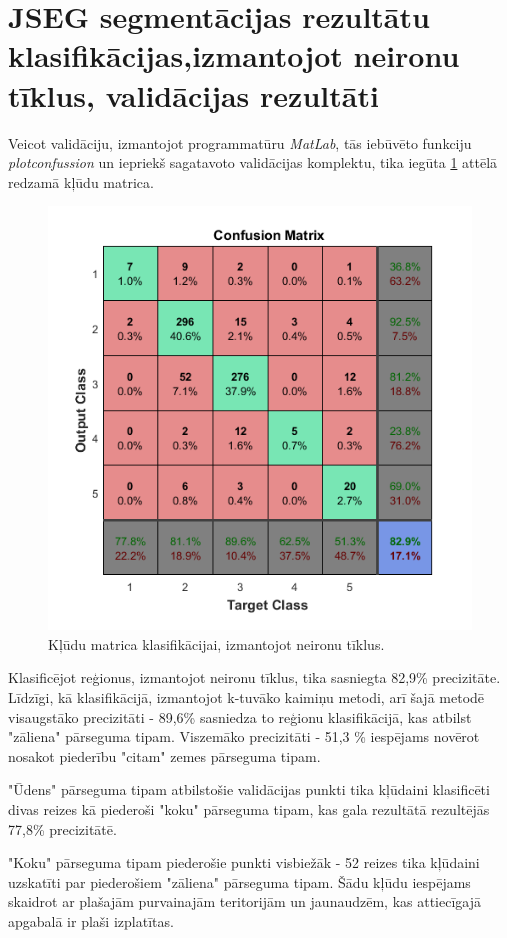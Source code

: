 \documentclass[12pt,paper=a4]{report}
\begin{document}
\section{JSEG segmentācijas rezultātu klasifikācijas,izmantojot neironu tīklus, validācijas rezultāti}
Veicot validāciju, izmantojot programmatūru \textit{MatLab}, tās iebūvēto funkciju \textit{plotconfussion} un iepriekš sagatavoto validācijas komplektu, tika iegūta \ref{fig:NNconfMatrix} attēlā redzamā kļūdu matrica. 
\begin{figure}[h!]
\centering
\includegraphics[width=.7\linewidth]{NNconfMatrix}
\caption{Kļūdu matrica klasifikācijai, izmantojot neironu tīklus.}
\label{fig:NNconfMatrix}
\end{figure}\par
Klasificējot reģionus, izmantojot neironu tīklus, tika sasniegta 82,9\% precizitāte. Līdzīgi, kā klasifikācijā, izmantojot k-tuvāko kaimiņu metodi, arī šajā metodē visaugstāko precizitāti - 89,6\% sasniedza to reģionu klasifikācijā, kas atbilst "zāliena" pārseguma tipam. Viszemāko precizitāti - 51,3 \% iespējams novērot nosakot piederību "citam" zemes pārseguma tipam.\par
"Ūdens" pārseguma tipam atbilstošie validācijas punkti tika kļūdaini klasificēti divas reizes kā piederoši "koku" pārseguma tipam, kas gala rezultātā rezultējās 77,8\% precizitātē.\par 
"Koku" pārseguma tipam piederošie punkti visbiežāk - 52 reizes tika kļūdaini uzskatīti par piederošiem "zāliena" pārseguma tipam. Šādu kļūdu iespējams skaidrot ar plašajām purvainajām teritorijām un jaunaudzēm, kas attiecīgajā apgabalā ir plaši izplatītas.\par
\end{document}
